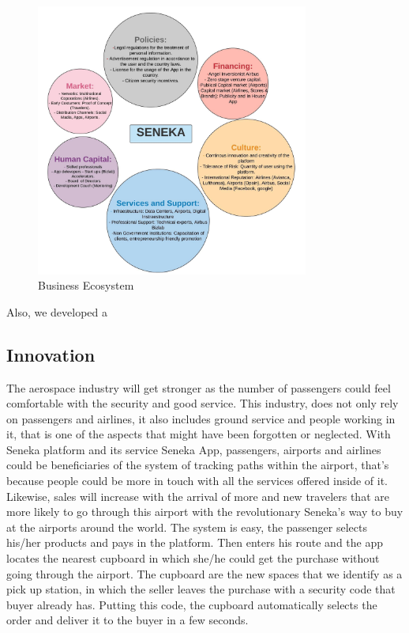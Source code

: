 \documentclass[12pt]{article}
\begin{document}
\begin{figure}[H]
	\centering
	\includegraphics[width=0.8\textwidth]{Ecosystem.jpeg}
	\caption { Business Ecosystem}
	\label{ecosystem}
\end{figure}
Also, we developed a 

\subsection{Innovation}

The aerospace industry will get stronger as the number of passengers could feel comfortable with the security and good service. This industry, does not only rely on passengers and airlines, it also includes ground service and people working in it, that is one of the aspects that might have been forgotten or neglected. With Seneka platform and its service Seneka App, passengers, airports and airlines could be beneficiaries of the system of tracking paths within the airport, that's because people could be more in touch with all the services offered inside of it.\\

Likewise, sales will increase with the arrival of more and new travelers that are more likely to go through this airport with the revolutionary Seneka's way to buy at the airports around the world. The system is easy, the passenger selects his/her products and pays in the platform. Then enters his route and the app locates the nearest cupboard in which she/he could get the purchase without going through the airport. The cupboard are the new spaces that we identify as a pick up station, in which the seller leaves the purchase with a security code that buyer already has. Putting this code, the cupboard automatically selects the order and deliver it to the buyer in a few seconds.\\
\end{document}
